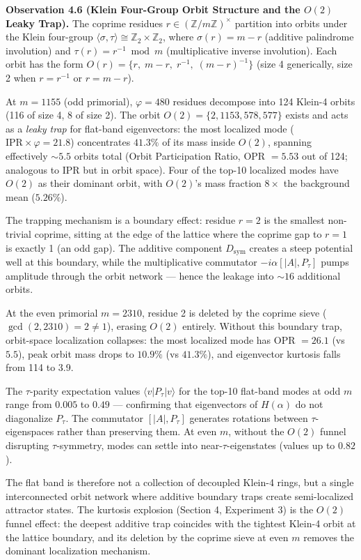 \documentclass[11pt,letterpaper]{article}
\theoremstyle{definition}
\theoremstyle{remark}
\begin{document}
\textbf{Observation 4.6 (Klein Four-Group Orbit Structure and the $O(2)$ Leaky Trap).} The coprime residues $r \in (\mathbb{Z}/m\mathbb{Z})^\times$ partition into orbits under the Klein four-group $\langle \sigma, \tau \rangle \cong \mathbb{Z}_2 \times \mathbb{Z}_2$, where $\sigma(r) = m - r$ (additive palindrome involution) and $\tau(r) = r^{-1} \bmod m$ (multiplicative inverse involution). Each orbit has the form $O(r) = \{r,\; m{-}r,\; r^{-1},\; (m{-}r)^{-1}\}$ (size 4 generically, size 2 when $r = r^{-1}$ or $r = m{-}r$).

At $m = 1155$ (odd primorial), $\varphi = 480$ residues decompose into 124 Klein-4 orbits (116 of size 4, 8 of size 2). The orbit $O(2) = \{2, 1153, 578, 577\}$ exists and acts as a \emph{leaky trap} for flat-band eigenvectors: the most localized mode ($\text{IPR} \times \varphi = 21.8$) concentrates $41.3\%$ of its mass inside $O(2)$, spanning effectively $\sim 5.5$ orbits total (Orbit Participation Ratio, OPR $= 5.53$ out of 124; analogous to IPR but in orbit space). Four of the top-10 localized modes have $O(2)$ as their dominant orbit, with $O(2)$'s mass fraction $8\times$ the background mean ($5.26\%$).

The trapping mechanism is a boundary effect: residue $r = 2$ is the smallest non-trivial coprime, sitting at the edge of the lattice where the coprime gap to $r = 1$ is exactly 1 (an odd gap). The additive component $D_{\text{sym}}$ creates a steep potential well at this boundary, while the multiplicative commutator $-i\alpha[|A|, P_\tau]$ pumps amplitude through the orbit network --- hence the leakage into $\sim 16$ additional orbits.

At the even primorial $m = 2310$, residue 2 is deleted by the coprime sieve ($\gcd(2, 2310) = 2 \neq 1$), erasing $O(2)$ entirely. Without this boundary trap, orbit-space localization collapses: the most localized mode has OPR $= 26.1$ (vs $5.5$), peak orbit mass drops to $10.9\%$ (vs $41.3\%$), and eigenvector kurtosis falls from 114 to 3.9.

The $\tau$-parity expectation values $\langle v | P_\tau | v \rangle$ for the top-10 flat-band modes at odd $m$ range from $0.005$ to $0.49$ --- confirming that eigenvectors of $H(\alpha)$ do not diagonalize $P_\tau$. The commutator $[|A|, P_\tau]$ generates rotations between $\tau$-eigenspaces rather than preserving them. At even $m$, without the $O(2)$ funnel disrupting $\tau$-symmetry, modes can settle into near-$\tau$-eigenstates (values up to $0.82$).

The flat band is therefore not a collection of decoupled Klein-4 rings, but a single interconnected orbit network where additive boundary traps create semi-localized attractor states. The kurtosis explosion (Section 4, Experiment 3) is the $O(2)$ funnel effect: the deepest additive trap coincides with the tightest Klein-4 orbit at the lattice boundary, and its deletion by the coprime sieve at even $m$ removes the dominant localization mechanism.
\end{document}
